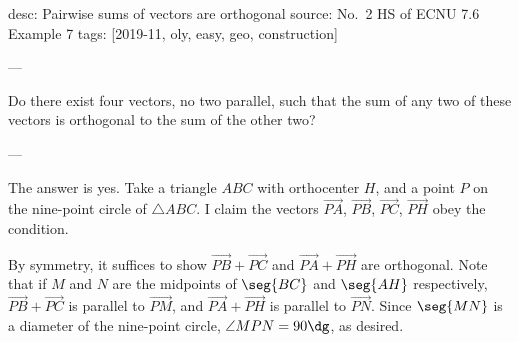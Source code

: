 desc: Pairwise sums of vectors are orthogonal
source: No.\ 2 HS of ECNU 7.6 Example 7
tags: [2019-11, oly, easy, geo, construction]

---

Do there exist four vectors, no two parallel, such that the sum of any two of these vectors is orthogonal to the sum of the other two?

---

The answer is yes. Take a triangle $ABC$ with orthocenter $H$, and a point $P$ on the nine-point circle of $\triangle ABC$. I claim the vectors $\overrightarrow{PA}$, $\overrightarrow{PB}$, $\overrightarrow{PC}$, $\overrightarrow{PH}$ obey the condition.

By symmetry, it suffices to show $\overrightarrow{PB}+\overrightarrow{PC}$ and $\overrightarrow{PA}+\overrightarrow{PH}$ are orthogonal. Note that if $M$ and $N$ are the midpoints of $\seg{BC}$ and $\seg{AH}$ respectively, $\overrightarrow{PB}+\overrightarrow{PC}$ is parallel to $\overrightarrow{PM}$, and $\overrightarrow{PA}+\overrightarrow{PH}$ is parallel to $\overrightarrow{PN}$. Since $\seg{MN}$ is a diameter of the nine-point circle, $\angle MPN=90\dg$, as desired.
